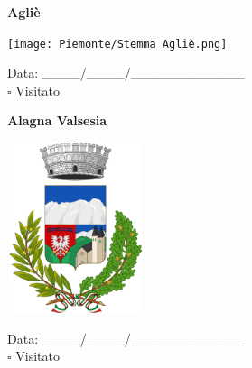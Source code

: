 \documentclass[a5paper,12pt]{article}
\begin{document}
\noindent
\begin{minipage}[t]{0.45\textwidth}
    \begin{center}
        \textbf{Agliè}
    \end{center}
    \vspace{-0.5cm} %
    \begin{center}
        \texttt{[image: Piemonte/Stemma Agliè.png]}
    \end{center}
    \vspace{-0.4cm} %
    \begin{flushleft}
        Data: \_\_\_\_/\_\_\_\_/\_\_\_\_\_\_\_\_\_\_\_\_ \\
        $\square$ Visitato
    \end{flushleft}
\end{minipage}
\hfill
\noindent
\begin{minipage}[t]{0.45\textwidth}
    \begin{center}
        \textbf{Alagna Valsesia}
    \end{center}
    \vspace{-0.5cm} %
    \begin{center}
        \includegraphics[height= 5cm, width=4cm]{Piemonte/Stemma Alagna Valsesia.png}
    \end{center}
    \vspace{-0.4cm} %
    \begin{flushleft}
        Data: \_\_\_\_/\_\_\_\_/\_\_\_\_\_\_\_\_\_\_\_\_ \\
        $\square$ Visitato
    \end{flushleft}
\end{minipage}

\vspace{0.7cm}
\end{document}
